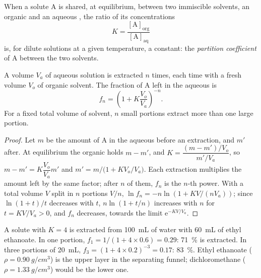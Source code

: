 \begin{definition}\label{def:b1:lab-techniques-1:partition-coefficient}
When a solute A is shared, at equilibrium, between two immiscible
solvents, an organic  and an aqueous , the ratio of its
concentrations
\[
  K = \frac{[\mathrm{A}]_{\mathrm{org}}}{[\mathrm{A}]_{\mathrm{aq}}}
\]
is, for dilute solutions at a given temperature, a constant: the
\emph{partition coefficient} of A between the
two solvents.
\end{definition}

\begin{proposition}\label{prop:b1:lab-techniques-1:multiple-extractions}
A volume $V_a$ of aqueous solution is extracted $n$ times, each time with a
fresh volume $V_o$ of organic solvent. The fraction of A left in the
aqueous  is
\[
  f_n = \left(1 + K \frac{V_o}{V_a}\right)^{-n}.
\]
For a fixed total volume of solvent, $n$ small portions extract more than
one large portion.
\end{proposition}
\begin{proof}
Let $m$ be the amount of A in the aqueous  before an extraction, and
$m'$ after. At equilibrium the organic  holds $m - m'$, and
$K = \dfrac{(m - m')/V_o}{m'/V_a}$, so $m - m' = K\dfrac{V_o}{V_a} m'$ and
$m' = m\big/\bigl(1 + K V_o/V_a\bigr)$. Each extraction multiplies the
amount left by the same factor; after $n$ of them, $f_n$ is the $n$-th
power. With a total volume $V$ split in $n$ portions $V/n$,
$\ln f_n = -n \ln(1 + KV/(nV_a))$; since $\ln(1+t)/t$ decreases with $t$,
$n \ln(1 + t/n)$ increases with $n$ for $t = KV/V_a > 0$, and $f_n$
decreases, towards the limit $\mathrm{e}^{-KV/V_a}$.
\end{proof}

\begin{example}
A solute with $K = 4$ is extracted from \qty{100}{mL} of water with
\qty{60}{mL} of ethyl ethanoate. In one portion,
$f_1 = 1/(1 + 4 \times 0.6) = 0.29$: \qty{71}{\percent} is extracted. In
three portions of \qty{20}{mL}, $f_3 = (1 + 4 \times 0.2)^{-3} = 0.17$:
\qty{83}{\percent}. Ethyl ethanoate ($\rho = \qty{0.90}{g/cm^3}$) is the
upper layer in the separating funnel; dichloromethane
($\rho = \qty{1.33}{g/cm^3}$) would be the lower one.
\end{example}

